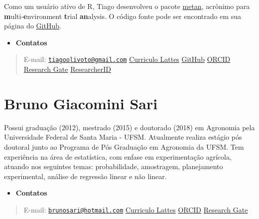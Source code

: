 \documentclass[
]{book}
\providecommand{\tightlist}{%
  \setlength{\itemsep}{0pt}\setlength{\parskip}{0pt}}
\numberwithin{equation}{section}
\begin{document}
Como um usuário ativo de R, Tiago desenvolveu o pacote \href{https://tiagoolivoto.github.io/metan/}{metan}, acrônimo para \textbf{m}ulti-\textbf{e}nvironment \textbf{t}rial \textbf{an}alysis. O código fonte pode ser encontrado em sua página do \href{https://github.com/TiagoOlivoto/metan}{GitHub}.

\begin{itemize}
\tightlist
\item
  \textbf{Contatos}
\end{itemize}

\begin{quote}
E-mail: \href{mailto:tiagoolivoto@gmail.com}{\nolinkurl{tiagoolivoto@gmail.com}} \textbar{} \href{http://buscatextual.cnpq.br/buscatextual/visualizacv.do?id=K4416862T6}{Curriculo Lattes} \textbar{} \href{https://github.com/TiagoOlivoto}{GitHub} \textbar{} \href{https://orcid.org/0000-0002-0241-9636}{ORCID} \textbar{} \href{https://www.researchgate.net/profile/Tiago_Olivoto2}{Research Gate} \textbar{} \href{https://publons.com/researcher/1431679/tiago-olivoto/}{ResearcherID}
\end{quote}

\hypertarget{bruno-giacomini-sari}{%
\section*{Bruno Giacomini Sari}\label{bruno-giacomini-sari}}

Possui graduação (2012), mestrado (2015) e doutorado (2018) em Agronomia pela Universidade Federal de Santa Maria - UFSM. Atualmente realiza estágio pós doutoral junto ao Programa de Pós Graduação em Agronomia da UFSM. Tem experiência na área de estatística, com enfase em experimentação agrícola, atuando nos seguintes temas: probabilidade, amostragem, planejamento experimental, análise de regressão linear e não linear.

\begin{itemize}
\tightlist
\item
  \textbf{Contatos}
\end{itemize}

\begin{quote}
E-mail: \href{mailto:brunosari@hotmail.com}{\nolinkurl{brunosari@hotmail.com}} \textbar{} \href{http://buscatextual.cnpq.br/buscatextual/visualizacv.do?id=K4406856U6}{Curriculo Lattes} \textbar{} \href{https://orcid.org/0000-0003-3405-9628}{ORCID} \textbar{} \href{https://www.researchgate.net/profile/Bruno_Sari}{Research Gate}
\end{quote}
\end{document}
